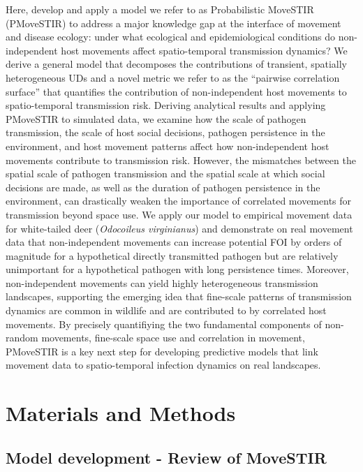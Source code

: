 \documentclass[letterpaper]{article}
\begin{document}
Here, develop and apply a model we refer to as Probabilistic MoveSTIR (PMoveSTIR) to address a major knowledge gap at the interface of movement and disease ecology: under what ecological and epidemiological conditions do non-independent host movements affect spatio-temporal transmission dynamics?  We derive a general model that decomposes the contributions of transient, spatially heterogeneous UDs and a novel metric we refer to as the ``pairwise correlation surface'' that quantifies the contribution of non-independent host movements to spatio-temporal transmission risk. 
Deriving analytical results and applying PMoveSTIR to simulated data, we examine how the scale of pathogen transmission, the scale of host social decisions, pathogen persistence in the environment, and host movement patterns affect how non-independent host movements contribute to transmission risk.  However, the mismatches between the spatial scale of pathogen transmission and the spatial scale at which social decisions are made, as well as the duration of pathogen persistence in the environment, can drastically weaken the importance of correlated movements for transmission beyond space use. We apply our model to empirical movement data for white-tailed deer (\emph{Odocoileus virginianus}) and demonstrate on real movement data that non-independent movements can increase potential FOI by orders of magnitude for a hypothetical directly transmitted pathogen but are relatively unimportant for a hypothetical pathogen with long persistence times. Moreover, non-independent movements can yield highly heterogeneous transmission landscapes, supporting the emerging idea that fine-scale patterns of transmission dynamics are common in wildlife \citep{Albery2021} and are contributed to by correlated host movements. By precisely quantifiying the two fundamental components of non-random movements, fine-scale space use and correlation in movement, PMoveSTIR is a key next step for developing predictive models that link movement data to spatio-temporal infection dynamics on real landscapes.


\section*{Materials and Methods}

\subsection*{Model development - Review of MoveSTIR}
\end{document}
